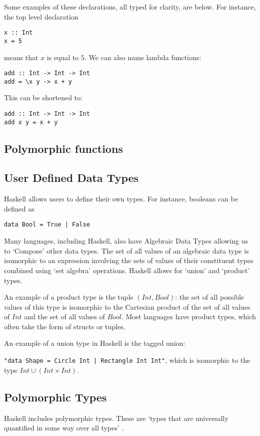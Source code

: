 Some examples of these declarations, all typed for clarity, are below. For instance, the top level declaration
\begin{verbatim}
x :: Int
x = 5
\end{verbatim}
means that $x$ is equal to $5$. We can also name lambda functions:
\begin{verbatim}
add :: Int -> Int -> Int
add = \x y -> x + y
\end{verbatim}
This can be shortened to:
\begin{verbatim}
add :: Int -> Int -> Int
add x y = x + y
\end{verbatim}

\subsection{Polymorphic functions}

\subsection{User Defined Data Types}
Haskell allows users to define their own types. For instance, booleans can be defined as
\begin{verbatim}
data Bool = True | False
\end{verbatim}

Many languages, including Haskell, also have Algebraic Data Types allowing us to `Compose' other data types. The set of all values of an algebraic data type is isomorphic to an expression involving the sets of values of their constituent types combined using `set algebra' operations. Haskell allows for `union' and `product' types.  

An example of a product type is the tuple \((Int, Bool)\): the set of all possible values of this type is isomorphic to the Cartesian product of the set of all values of \(Int\) and the set of all values of $Bool$. Most languages have product types, which often take the form of structs or tuples. 

An example of a union type in Haskell is the tagged union:

\noindent\verb!"data Shape = Circle Int | Rectangle Int Int"!, which is isomorphic to the type \(Int \cup (Int \times Int)\). 

\subsection{Polymorphic Types}
Haskell includes polymorphic types. These are `types that are universally quantified in some way over all types' \cite{hudak1992gentle}. 

